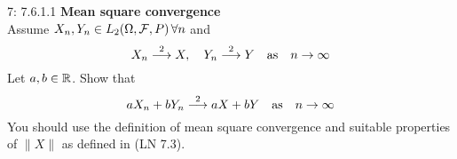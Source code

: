 \documentclass[a4paper,twoside=false,abstract=false,numbers=noenddot,
titlepage=false,headings=small,parskip=half,version=last]{scrartcl}
\begin{document}
\begin{exercise}{7: 7.6.1.1} \textbf{Mean square convergence}\\
    Assume $X_n, Y_n\in \text{$L_2$}(\Omega,\mathcal{F},P)\, \forall n$ and
    \begin{equation}
        X_n \stackrel{2}{\longrightarrow} X, \quad
        Y_n \stackrel{2}{\longrightarrow} Y \quad
        \text{as}\quad n\rightarrow\infty
    \end{equation}
    Let $a, b \in \mathbb{R}$. Show that
    \begin{equation}
        aX_n + bY_n\stackrel{2}{\longrightarrow} aX + bY\quad
        \text{as}\quad n\rightarrow\infty
    \end{equation}
    You should use the definition of mean square convergence and suitable
    properties of $\|X\|$ as defined in (LN 7.3).
\end{exercise}
\begin{solution}
\end{solution}
\pagebreak

\end{document}

